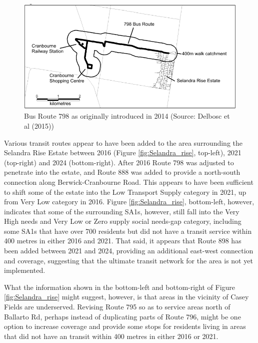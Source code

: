 \documentclass[preprint, 3p,
authoryear]{elsarticle} %
\begin{document}
\begin{figure}

{\centering \includegraphics[width=1\linewidth]{graphics/Route798} 

}

\caption{Bus Route 798 as originally introduced in 2014 (Source: Delbosc et al (2015))}\label{fig:Bus_798}
\end{figure}

Various transit routes appear to have been added to the area surrounding
the Selandra Rise Estate between 2016 (Figure \ref{fig:Selandra_rise},
top-left), 2021 (top-right) and 2024 (bottom-right). After 2016 Route
798 was adjusted to penetrate into the estate, and Route 888 was added
to provide a north-south connection along Berwick-Cranbourne Road. This
appears to have been sufficient to shift some of the estate into the Low
Transport Supply category in 2021, up from Very Low category in 2016.
Figure \ref{fig:Selandra_rise}, bottom-left, however, indicates that
some of the surrounding SA1s, however, still fall into the Very High
needs and Very Low or Zero supply social needs-gap category, including
some SA1s that have over 700 residents but did not have a transit
service within 400 metres in either 2016 and 2021. That said, it appears
that Route 898 has been added between 2021 and 2024, providing an
additional east-west connection and coverage, suggesting that the
ultimate transit network for the area is not yet implemented.

What the information shown in the bottom-left and bottom-right of Figure
\ref{fig:Selandra_rise} might suggest, however, is that areas in the
vicinity of Casey Fields are underserved. Revising Route 795 so as to
service areas north of Ballarto Rd, perhaps instead of duplicating parts
of Route 796, might be one option to increase coverage and provide some
stops for residents living in areas that did not have an transit within
400 metres in either 2016 or 2021.
\end{document}
